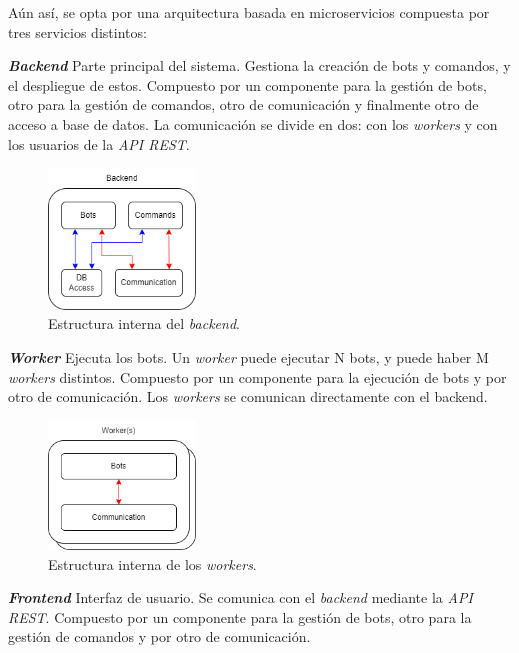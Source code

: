 Aún así, se opta por una arquitectura basada en microservicios compuesta por tres servicios distintos:

\textbf{\textit{Backend}} Parte principal del sistema. Gestiona la creación de bots y comandos, y el despliegue de estos. Compuesto por un componente para la gestión de bots, otro para la gestión de comandos, otro de comunicación y finalmente otro de acceso a base de datos. La comunicación se divide en dos: con los \textit{workers} y con los usuarios de la \textit{API REST}.

\begin{figure}[H]
	\centering
	\includegraphics[width=0.35\textwidth]{img/backend_internals.png}
	\caption{Estructura interna del \textit{backend}.}
\end{figure}

\textbf{\textit{Worker}} Ejecuta los bots. Un \textit{worker} puede ejecutar N bots, y puede haber M \textit{workers} distintos. Compuesto por un componente para la ejecución de bots y por otro de comunicación. Los \textit{workers} se comunican directamente con el backend.

\begin{figure}[H]
	\centering
	\includegraphics[width=0.35\textwidth]{img/worker_internals.png}
	\caption{Estructura interna de los \textit{workers}.}
\end{figure}


\textbf{\textit{Frontend}} Interfaz de usuario. Se comunica con el \textit{backend} mediante la \textit{API REST}. Compuesto por un componente para la gestión de bots, otro para la gestión de comandos y por otro de comunicación.

